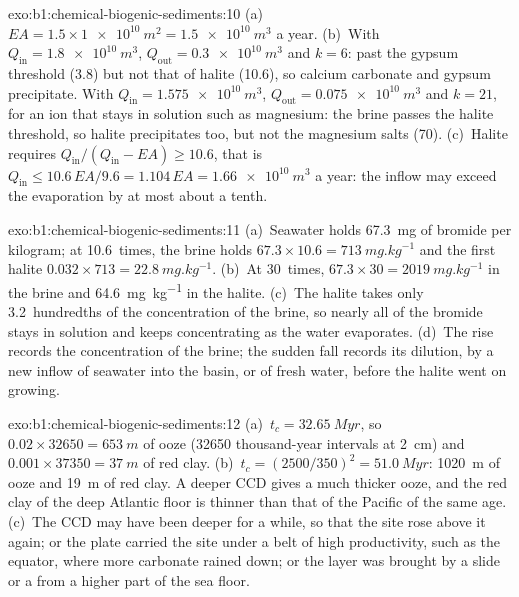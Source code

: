 \begin{solution}{exo:b1:chemical-biogenic-sediments:10}
(a)~$EA = 1.5\times\qty{1e10}{m^2} = \qty{1.5e10}{m^3}$ a year. (b)~With
$Q_{\mathrm{in}} = \qty{1.8e10}{m^3}$, $Q_{\mathrm{out}} = \qty{0.3e10}{m^3}$ and
$k = 6$: past the gypsum threshold (3.8) but not that of halite (10.6), so
calcium carbonate and gypsum precipitate. With $Q_{\mathrm{in}} =
\qty{1.575e10}{m^3}$, $Q_{\mathrm{out}} = \qty{0.075e10}{m^3}$ and $k = 21$, for
an ion that stays in solution such as magnesium: the brine passes the halite
threshold, so halite precipitates too, but not the magnesium salts (70).
(c)~Halite requires $Q_{\mathrm{in}}/(Q_{\mathrm{in}} - EA) \ge 10.6$, that is
$Q_{\mathrm{in}} \le 10.6\,EA/9.6 = 1.104\,EA = \qty{1.66e10}{m^3}$ a year: the
inflow may exceed the evaporation by at most about a tenth.
\end{solution}

\begin{solution}{exo:b1:chemical-biogenic-sediments:11}
(a)~Seawater holds \qty{67.3}{mg} of bromide per kilogram; at 10.6~times, the
brine holds $67.3\times10.6 = \qty{713}{mg.kg^{-1}}$ and the first halite
$0.032\times713 = \qty{22.8}{mg.kg^{-1}}$. (b)~At 30~times, $67.3\times30 =
\qty{2019}{mg.kg^{-1}}$ in the brine and \qty{64.6}{mg.kg^{-1}} in the halite.
(c)~The halite takes only 3.2~hundredths of the concentration of the brine, so
nearly all of the bromide stays in solution and keeps concentrating as the water
evaporates. (d)~The rise records the concentration of the brine; the sudden fall
records its dilution, by a new inflow of seawater into the basin, or of fresh
water, before the halite went on growing.
\end{solution}

\begin{solution}{exo:b1:chemical-biogenic-sediments:12}
(a)~$t_c = \qty{32.65}{Myr}$, so $0.02\times\num{32650} = \qty{653}{m}$ of
ooze (\num{32650} thousand-year intervals at \qty{2}{cm}) and
$0.001\times\num{37350} = \qty{37}{m}$ of red clay. (b)~$t_c = (2500/350)^2 =
\qty{51.0}{Myr}$: \qty{1020}{m} of ooze and \qty{19}{m} of red clay. A deeper CCD
gives a much thicker ooze, and the red clay of the deep Atlantic floor is thinner
than that of the Pacific of the same age. (c)~The CCD may have been deeper for a
while, so that the site rose above it again; or the plate carried the site under
a belt of high productivity, such as the equator, where more carbonate rained
down; or the layer was brought by a slide or a  from a higher
part of the sea floor.
\end{solution}

